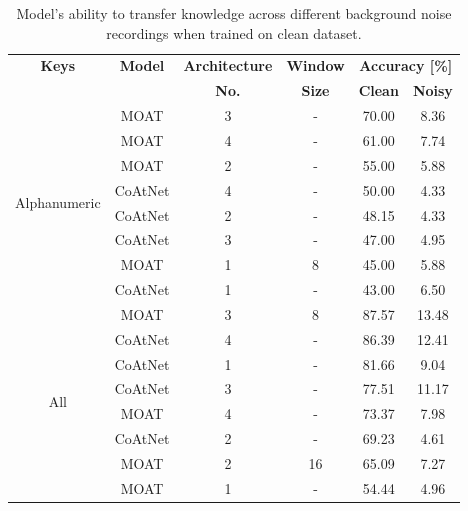 \documentclass[a4paper,11pt,twoside]{report}
\theoremstyle{definition}
\begin{document}
\begin{table}[h!]
\centering
\caption{Model's ability to transfer knowledge across different background noise recordings when trained on clean dataset.}
\begin{adjustbox}{max width=\textwidth}
\begin{tabular}{c|c|c|c|cc}
\hline
\textbf{Keys} & \textbf{Model} & \textbf{Architecture} & \textbf{Window} &  \multicolumn{2}{c}{\textbf{Accuracy [\%]}} \\
\cline{5-6}
       & & \textbf{No.}  &   \textbf{Size}   &  \textbf{Clean} & \textbf{Noisy}  \\
\hline
\multirow{8}{*}{Alphanumeric}
  & MOAT    & 3 & -         & 70.00 & 8.36 \\
  & MOAT    & 4 & -         & 61.00 & 7.74 \\
  & MOAT    & 2 & -         & 55.00 & 5.88 \\
  & CoAtNet & 4 & -         & 50.00 & 4.33 \\
  & CoAtNet & 2 & -         & 48.15 & 4.33 \\
  & CoAtNet & 3 & -         & 47.00 & 4.95 \\
  & MOAT    & 1 & 8         & 45.00 & 5.88 \\
  & CoAtNet & 1 & -         & 43.00 & 6.50 \\
\hline
\multirow{8}{*}{All}
  & MOAT    & 3 & 8         & 87.57 & 13.48 \\
  & CoAtNet & 4 & -         & 86.39 & 12.41 \\
  & CoAtNet & 1 & -         & 81.66 & 9.04 \\
  & CoAtNet & 3 & -         & 77.51 & 11.17 \\
  & MOAT    & 4 & -         & 73.37 & 7.98 \\
  & CoAtNet & 2 & -         & 69.23 & 4.61 \\
  & MOAT    & 2 & 16        & 65.09 & 7.27 \\
  & MOAT    & 1 & -         & 54.44 & 4.96 \\
\hline
\end{tabular}
\end{adjustbox}
\end{table}
\end{document}
